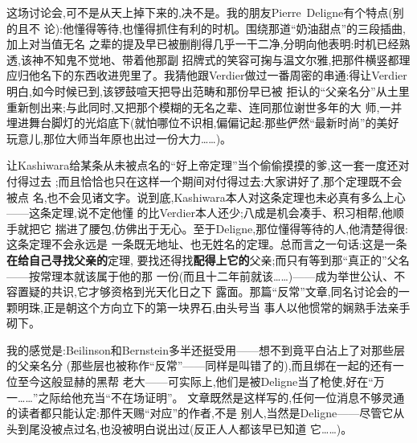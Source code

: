 这场讨论会,可不是从天上掉下来的,决不是。我的朋友Pierre~Deligne有个特点(别的且不
论):他懂得等待,也懂得抓住有利的时机。围绕那道“奶油甜点”的三段插曲,加上对当值无名
之辈的提及早已被删削得几乎一干二净,分明向他表明:时机已经熟透,该神不知鬼不觉地、带着他那副
招牌式的笑容可掬与温文尔雅,把那件横竖都理应归他名下的东西收进兜里了。我猜他跟Verdier做过一番周密的串通:得让Verdier明白,如今时候已到,该锣鼓喧天把导出范畴和那份早已被
拒认的“父亲名分”从土里重新刨出来;与此同时,又把那个模糊的无名之辈、连同那位谢世多年的大
师,一并埋进舞台脚灯的光焰底下(就怕哪位不识相,偏偏记起:那些俨然“最新时尚”的美好
玩意儿,那位大师当年原也出过一份大力……)。

\pmark{}让Kashiwara给某条从未被点名的“好上帝定理”当个偷偷摸摸的爹,这一套一度还对付得过去
;而且恰恰也只在这样一个期间对付得过去:大家讲好了,那个定理既不会被点
名,也不会见诸文字。说到底,Kashiwara本人对这条定理也未必真有多么上心——这条定理,说不定他懂
的比Verdier本人还少;八成是机会凑手、积习相帮,他顺手就把它
揣进了腰包,仿佛出于无心。至于Deligne,那位懂得等待的人,他清楚得很:这条定理不会永远是
一条既无地址、也无姓名的定理。总而言之一句话:这是一条\textbf{在给自己寻找父亲的}定理,
要找还得找\textbf{配得上它的}父亲;而只有等到那“真正的”父名——按常理本就该属于他的那
一份(而且十二年前就该……)——成为举世公认、不容置疑的共识,它才够资格到光天化日之下
露面。那篇“反常”文章,同名讨论会的一颗明珠,正是朝这个方向立下的第一块界石,由头号当
事人以他惯常的娴熟手法亲手砌下。

我的感觉是:Beilinson和Bernstein多半还挺受用——想不到竟平白沾上了对那些层的父亲名分
(那些层也被称作“反常”——同样是叫错了的),而且绑在一起的还有一位至今这般显赫的黑帮
老大——可实际上,他们是被Deligne当了枪使,好在“万一……”之际给他充当“不在场证明”。
文章既然是这样写的,任何一位消息不够灵通的读者都只能认定:那件天赐“对应”的作者,不是
别人,当然是Deligne——尽管它从头到尾没被点过名,也没被明白说出过(反正人人都该早已知道
它……)。

